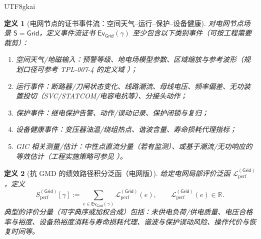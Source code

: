 \documentclass[12pt]{article}
\newtheorem{definition}{定义}[section]
\newcommand{\RR}{\mathbb{R}}
\begin{document}
\begin{CJK*}{UTF8}{gkai}
\begin{definition}[电网节点的证书事件流：空间天气--运行--保护--设备健康]
\label{def:grid-eventstream}
对电网节点场景 $\mathsf{S}=\mathsf{Grid}$，定义事件流证书 $\mathsf{Ev}_{\mathsf{Grid}}(\gamma)$ 至少包含以下类别事件（可按工程需要裁剪）：
\begin{enumerate}
  \item 空间天气/地磁输入：预警等级、地电场模型参数、区域缩放与参考波形（规划口径可参考 \textsf{TPL-007-4} 的定义域 \cite{ref_nerc_tpl_007_4}）；
  \item 运行事件：断路器/刀闸状态变化、线路潮流、母线电压、频率偏差、无功装置投切（SVC/STATCOM/电容电抗等）、分接头动作；
  \item 保护事件：继电保护告警、动作/误动记录、保护闭锁与复归；
  \item 设备健康事件：变压器油温/绕组热点、谐波含量、寿命损耗代理指标；
  \item GIC 相关测量/估计：中性点直流分量（若有监测）、或基于潮流/无功响应的等效估计（工程实施策略可参见 \cite{ref_doe_gmd_monitoring_strategies}）。
\end{enumerate}
\end{definition}

\begin{definition}[抗 GMD 的绩效路径积分泛函（电网版）]
\label{def:grid-performance-functional}
给定电网局部评价泛函 $\mathcal{L}_{\mathrm{perf}}^{(\mathsf{Grid})}$，定义
\[
  S_{\mathrm{perf}}^{(\mathsf{Grid})}[\gamma]
  :=
  \sum_{e\in \mathsf{Ev}_{\mathsf{Grid}}(\gamma)} \mathcal{L}_{\mathrm{perf}}^{(\mathsf{Grid})}(e),
  \qquad
  \mathcal{L}_{\mathrm{perf}}^{(\mathsf{Grid})}(e)\in\RR.
\]
典型的评价分量（可字典序或加权合成）包括：未供电负荷/供电质量、电压合格率与裕度、设备热裕度消耗与寿命损耗代理、谐波与保护误动风险、操作代价与恢复时间等。
\end{definition}


\end{CJK*}
\end{document}
